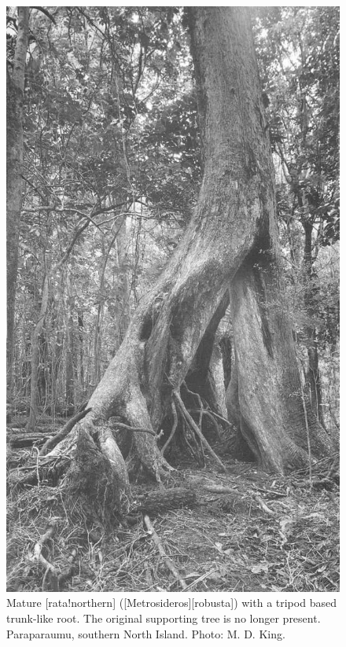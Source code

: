 \begin{figure}[!htb]
\begin{minipage}[t]{0.45\textwidth}
    	\includegraphics[width=\textwidth]{graphics/figure51rata.jpg}
    	\caption[Mature northern rata with a tripod based trunk-like root]{Mature [rata!northern] ([Metrosideros][robusta]) with a tripod based trunk-like root.
    	The original supporting tree is no longer present.
    	Paraparaumu, southern North Island.
    	Photo: M. D. King.}%
    	\label{fig:51rata}
	\end{minipage}
\end{figure}

